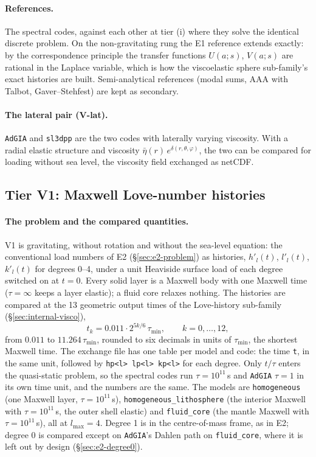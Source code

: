 \documentclass[11pt]{article}
\numberwithin{equation}{section}
\newcommand{\code}[1]{\texttt{#1}}
\begin{document}
\paragraph{References.} The spectral codes, against each other at tier
(i) where they solve the identical discrete problem. On the non-gravitating
rung the E1 reference extends exactly: by the correspondence principle the
transfer functions $U(a;s)$, $V(a;s)$ are rational in the Laplace variable,
which is how the viscoelastic sphere sub-family's exact histories are built.
Semi-analytical references (modal sums, AAA with Talbot, Gaver--Stehfest)
are kept as secondary.

\paragraph{The lateral pair (V-lat).} \code{AdGIA} and \code{sl3dpp} are the
two codes with laterally varying viscosity. With a radial elastic structure
and viscosity $\bar\eta(r)\,e^{\delta(r,\theta,\varphi)}$, the two can be
compared for loading without sea level, the viscosity field exchanged as
netCDF.

\subsection{Tier V1: Maxwell Love-number histories}
\label{sec:v1}

\paragraph{The problem and the compared quantities.} V1 is gravitating, without rotation and without the
sea-level equation:
the conventional load numbers of E2 (\S\ref{sec:e2-problem}) as histories,
$h'_l(t)$, $l'_l(t)$, $k'_l(t)$ for degrees 0--4, under a unit Heaviside
surface load of each degree switched on at $t=0$. Every solid layer is a
Maxwell body with one Maxwell time ($\tau=\infty$ keeps a layer elastic); a
fluid core relaxes nothing. The histories are compared at the 13 geometric
output times of the Love-history sub-family (\S\ref{sec:internal-visco}),
\begin{equation}
  t_k = 0.011\cdot2^{5k/6}\,\tau_{\min},\qquad k=0,\dots,12,
  \label{eq:v1-times}
\end{equation}
from $0.011$ to $11.264\,\tau_{\min}$, rounded to six decimals in units of
$\tau_{\min}$, the shortest Maxwell time. The exchange file has one table
per model and code: the time \code{t}, in the same unit, followed by
\code{hp<l> lp<l> kp<l>} for each degree. Only $t/\tau$ enters the
quasi-static problem, so the spectral codes run $\tau=10^{11}$\,s and
\code{AdGIA} $\tau=1$ in its own time unit, and the numbers are the same.
The models are \code{homogeneous} (one Maxwell layer, $\tau=10^{11}$\,s),
\code{homogeneous\_lithosphere} (the interior Maxwell with
$\tau=10^{11}$\,s, the outer shell elastic) and \code{fluid\_core} (the
mantle Maxwell with $\tau=10^{11}$\,s), all at $l_{\max}=4$. Degree 1 is in
the centre-of-mass frame, as in E2; degree 0 is compared except on
\code{AdGIA}'s Dahlen path on \code{fluid\_core}, where it is left out by
design (\S\ref{sec:e2-degree0}).
\end{document}
